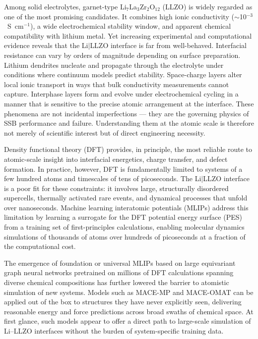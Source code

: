 \documentclass[12pt,a4paper,oneside]{book}
\begin{document}
Among solid electrolytes, garnet-type Li$_7$La$_3$Zr$_2$O$_{12}$ (LLZO) is widely
regarded as one of the most promising candidates. It combines high ionic conductivity
($\sim$10$^{-3}$~S~cm$^{-1}$), a wide electrochemical stability window, and apparent
chemical compatibility with lithium metal. Yet increasing experimental and computational
evidence reveals that the Li$|$LLZO interface is far from well-behaved. Interfacial
resistance can vary by orders of magnitude depending on surface preparation. Lithium
dendrites nucleate and propagate through the electrolyte under conditions where
continuum models predict stability. Space-charge layers alter local ionic transport in
ways that bulk conductivity measurements cannot capture. Interphase layers form and
evolve under electrochemical cycling in a manner that is sensitive to the precise
atomic arrangement at the interface.
\cite{Iwasaki2024UNNP_LLZOLi,Burov2024LiLLZOChargeTransfer,Zhang2025DendritePenetration}
These phenomena are not incidental imperfections --- they are the governing physics of
SSB performance and failure. Understanding them at the atomic scale is therefore not
merely of scientific interest but of direct engineering necessity.

Density functional theory (DFT) provides, in principle, the most reliable
route to atomic-scale insight into interfacial energetics, charge transfer, and
defect formation. In practice, however, DFT is fundamentally limited to systems
of a few hundred atoms and timescales of tens of picoseconds. The Li$|$LLZO interface
is a poor fit for these constraints: it involves large, structurally disordered
supercells, thermally activated rare events, and dynamical processes that unfold
over nanoseconds. Machine learning interatomic potentials (MLIPs) address this
limitation by learning a surrogate for the DFT potential energy surface (PES) from
a training set of first-principles calculations, enabling molecular dynamics
simulations of thousands of atoms over hundreds of picoseconds at a fraction of the
computational cost.
\cite{Batzner2022NequIP,Batatia2022MACE,Morrow2023Validate}

The emergence of foundation or universal MLIPs based on large equivariant graph neural
networks pretrained on millions of DFT calculations spanning diverse chemical
compositions  has further lowered the barrier to atomistic simulation of new
systems. Models such as MACE-MP and MACE-OMAT can be applied out of the box to
structures they have never explicitly seen, delivering reasonable energy and force
predictions across broad swaths of chemical space.
\cite{Batatia2023FoundationMACE,Chen2022M3GNet,Deng2023chgnet}
At first glance, such models appear to offer a direct path to large-scale simulation
of Li--LLZO interfaces without the burden of system-specific training data.
\end{document}
